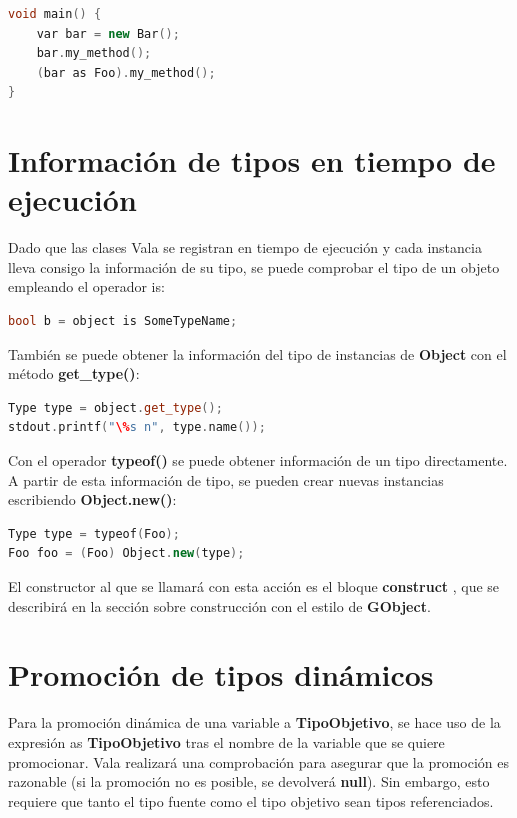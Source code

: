 \documentclass[12pt,twoside]{book}
\begin{document}
\begin{lstlisting}[language=C++]
void main() {
	var bar = new Bar();
	bar.my_method();
	(bar as Foo).my_method();
}
\end{lstlisting}

\section{Información de tipos en tiempo de ejecución}



Dado que las clases Vala se registran en tiempo de ejecución y cada instancia lleva consigo la información de su tipo, se puede comprobar el tipo de un objeto empleando el operador is:

\begin{lstlisting}[language=C++]
bool b = object is SomeTypeName;
\end{lstlisting}

También se puede obtener la información del tipo de instancias de \textbf{Object} con el método \textbf{get\_type()}:

\begin{lstlisting}[language=C++]
Type type = object.get_type();
stdout.printf("\%s n", type.name());
\end{lstlisting}

Con el operador \textbf{typeof()} se puede obtener información de un tipo directamente. A partir de esta información de tipo, se pueden crear nuevas instancias escribiendo \textbf{Object.new()}:

\begin{lstlisting}[language=C++]
Type type = typeof(Foo);
Foo foo = (Foo) Object.new(type);
\end{lstlisting}

El constructor al que se llamará con esta acción es el bloque \textbf{construct {}}, que se describirá en la sección sobre construcción con el estilo de \textbf{GObject}.

\section{Promoción de tipos dinámicos}

Para la promoción dinámica de una variable a \textbf{TipoObjetivo}, se hace uso de la expresión as \textbf{TipoObjetivo} tras el nombre de la variable que se quiere promocionar. Vala realizará una comprobación para asegurar que la promoción es razonable (si la promoción no es posible, se devolverá \textbf{null}). Sin embargo, esto requiere que tanto el tipo fuente como el tipo objetivo sean tipos referenciados.
\end{document}
